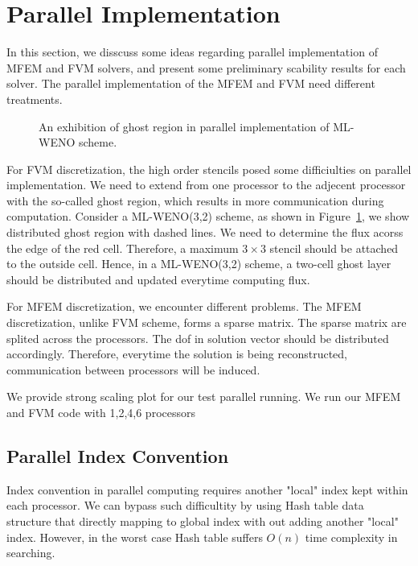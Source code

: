 
\section{Parallel Implementation}
In this section, we disscuss some ideas regarding parallel implementation
of MFEM and FVM solvers, and present some preliminary scability results for each 
solver.
The parallel implementation of the MFEM and FVM need different treatments.

\begin{figure}[htb]
\centering

		  \caption{An exhibition of ghost region in parallel implementation of 
		  ML-WENO scheme.}
\label{fig:meshexample}
\end{figure}

For FVM discretization, the high order stencils posed some difficiulties 
on parallel implementation. We need to extend from one processor to
the adjecent processor with the so-called ghost region, which results
 in more communication during computation.
Consider a ML-WENO(3,2) scheme, as shown in Figure~\ref{fig:meshexample}, 
we show distributed ghost region with dashed lines.
We need to determine the flux acorss the edge of the red cell.
Therefore, a maximum $3\times 3$ stencil should be attached to the outside
cell. Hence, in a ML-WENO(3,2) scheme, a two-cell ghost layer should be
distributed and updated everytime computing flux. 

For MFEM discretization, we encounter different problems.
The MFEM discretization, unlike FVM scheme, forms a sparse matrix.
The sparse matrix are splited across the processors. The dof in solution
vector should be distributed accordingly. Therefore, everytime the solution 
is being reconstructed, communication between processors will be induced.

We provide strong scaling plot for our test parallel running.
We run our MFEM and FVM code with 1,2,4,6 processors

\subsection{Parallel Index Convention}
Index convention in parallel computing requires another "local" index 
kept within each processor.
We can bypass such difficultity by using Hash table data structure
that directly mapping to global index with out adding another "local"
index. However, in the worst case Hash table suffers $O(n)$ time
complexity in searching.

